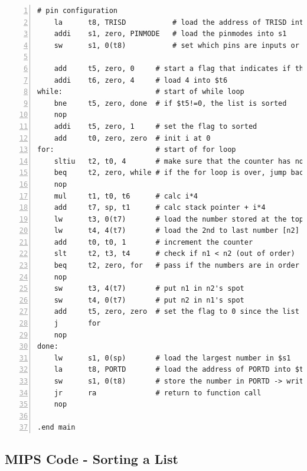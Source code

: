 \documentclass[11pt]{article}
\begin{document}
\begin{lstlisting}[numbers=left,basicstyle=\footnotesize]
    # pin configuration
    la      t8, TRISD           # load the address of TRISD into t8
    addi    s1, zero, PINMODE   # load the pinmodes into s1
    sw      s1, 0(t8)           # set which pins are inputs or outputs.

    add     t5, zero, 0     # start a flag that indicates if the list is sorted.
    addi    t6, zero, 4     # load 4 into $t6
while:                      # start of while loop
    bne     t5, zero, done  # if $t5!=0, the list is sorted
    nop
    addi    t5, zero, 1     # set the flag to sorted
    add     t0, zero, zero  # init i at 0 
for:                        # start of for loop
    sltiu   t2, t0, 4       # make sure that the counter has not exceeded the length of the list
    beq     t2, zero, while # if the for loop is over, jump back to the while loop
    nop
    mul     t1, t0, t6      # calc i*4
    add     t7, sp, t1      # calc stack pointer + i*4
    lw      t3, 0(t7)       # load the number stored at the top of the stack (lowest addr) [n1]
    lw      t4, 4(t7)       # load the 2nd to last number [n2]
    add     t0, t0, 1       # increment the counter
    slt     t2, t3, t4      # check if n1 < n2 (out of order)
    beq     t2, zero, for   # pass if the numbers are in order ($t2=0)
    nop
    sw      t3, 4(t7)       # put n1 in n2's spot
    sw      t4, 0(t7)       # put n2 in n1's spot
    add     t5, zero, zero  # set the flag to 0 since the list is not sorted
    j       for
    nop
done:
    lw      s1, 0(sp)       # load the largest number in $s1
    la      t8, PORTD       # load the address of PORTD into $t8
    sw      s1, 0(t8)       # store the number in PORTD -> write to LEDs
    jr      ra              # return to function call
    nop

.end main

\end{lstlisting}


\subsection{MIPS Code - Sorting a List}
\end{document}
